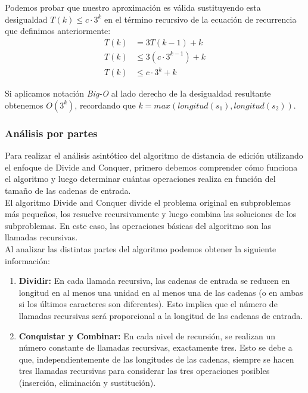 Podemos probar que nuestro aproximación es válida sustituyendo esta desigualdad $T(k) \leq c \cdot 3^k$ en el término recursivo de la ecuación de recurrencia que definimos anteriormente:
\begin{align*}
T(k) &= 3T(k-1)+k \\
T(k) &\leq 3(c \cdot 3^{k-1})+k \\
T(k) &\leq c \cdot 3^k+k
\end{align*}

Si aplicamos notación \textit{Big-O} al lado derecho de la desigualdad resultante obtenemos $O(3^k)$, recordando que $k=max(longitud(s_1), longitud(s_2))$.


\subsubsection{Análisis por partes}
Para realizar el análisis asintótico del algoritmo de distancia de edición utilizando el enfoque de Divide and Conquer, primero debemos comprender cómo funciona el algoritmo y luego determinar cuántas operaciones realiza en función del tamaño de las cadenas de entrada.\\

El algoritmo Divide and Conquer divide el problema original en subproblemas más pequeños, los resuelve recursivamente y luego combina las soluciones de los subproblemas. En este caso, las operaciones básicas del algoritmo son las llamadas recursivas.\\

Al analizar las distintas partes del algoritmo podemos obtener la siguiente información:

\begin{enumerate}
    \item \textbf{Dividir:} En cada llamada recursiva, las cadenas de entrada se reducen en longitud en al menos una unidad en al menos una de las cadenas (o en ambas si los últimos caracteres son diferentes). Esto implica que el número de llamadas recursivas será proporcional a la longitud de las cadenas de entrada.

    \item \textbf{Conquistar y Combinar:} En cada nivel de recursión, se realizan un número constante de llamadas recursivas, exactamente tres. Esto se debe a que, independientemente de las longitudes de las cadenas, siempre se hacen tres llamadas recursivas para considerar las tres operaciones posibles (inserción, eliminación y sustitución).
\end{enumerate}

